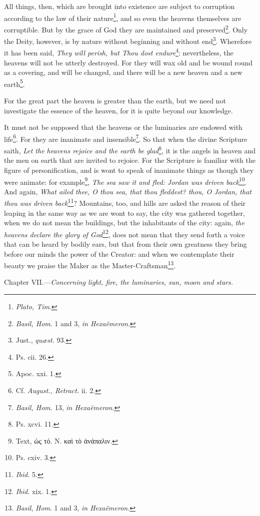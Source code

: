 All things, then, which are brought into existence are subject to corruption according to the law of their nature\footnote{\emph{Plato, Tim}.}, and so even the heavens themselves are corruptible. But by the grace of God they are maintained and preserved\footnote{\emph{Basil, Hom}. 1 and 3, \emph{in Hexaëmeron}.}. Only the Deity, however, is by nature without beginning and without end\footnote{Just., \emph{quæst. }93.}. Wherefore it has been said, \emph{They will perish, but Thou dost endure}\footnote{Ps. cii. 26.}: nevertheless, the heavens will not be utterly destroyed. For they will wax old and be wound round as a covering, and will be changed, and there will be a new heaven and a new earth\footnote{Apoc. xxi. 1.}.

For the great part the heaven is greater than the earth, but we need not investigate the essence of the heaven, for it is quite beyond our knowledge.

It must not be supposed that the heavens or the luminaries are endowed with life\footnote{Cf. \emph{August., Retract. }ii. 2.}. For they are inanimate and insensible\footnote{\emph{Basil, Hom.} 13, \emph{in Hexaëmeron}.}. So that when the divine Scripture saith, \emph{Let the heavens rejoice and the earth be glad}\footnote{Ps. xcvi. 11.}, it is the angels in heaven and the men on earth that are invited to rejoice. For the Scripture is familiar with the figure of personification, and is wont to speak of inanimate things as though they were animate: for example\footnote{Text, \textgreek{ὡς τό}. N. \textgreek{καὶ τὸ ἀνάπαλιν}.}, \emph{The sea saw it and fled: Jordan was driven back}\footnote{Ps. cxiv. 3.}. And again, \emph{What ailed thee, O thou sea, that thou fleddest? thou, O Jordan, that thou was driven back}\footnote{\emph{Ibid.} 5.}? Mountains, too, and hills are asked the reason of their leaping in the same way as we are wont to say, the city was gathered together, when we do not mean the buildings, but the inhabitants of the city: again, \emph{the heavens declare the glory of God}\footnote{\emph{Ibid.} xix. 1.}, does not mean that they send forth a voice that can be heard by bodily ears, but that from their own greatness they bring before our minds the power of the Creator: and when we contemplate their beauty we praise the Maker as the Master-Craftsman\footnote{\emph{Basil}, \emph{Hom}. 1 and 3, \emph{in Hexaëmeron}.}.


Chapter VII.—\emph{Concerning light, fire, the luminaries, sun, moon and stars.}

